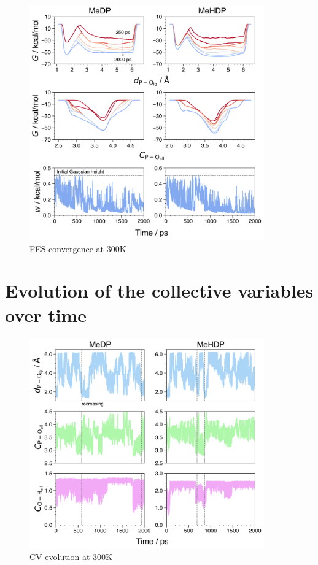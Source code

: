 \begin{figure}[ht]
    \centering
    \includegraphics[width=0.9\textwidth]{Figures/4_Results/results_300K_fes_convergence.png}
    \caption{FES convergence at 300K}
    \label{fig:300k_fes_convergence}
\end{figure}



\clearpage
\section{Evolution of the collective variables over time}

\begin{figure}[ht]
    \centering
    \includegraphics[width=0.9\textwidth]{Figures/4_Results/results_300K_cv_evolution.png}
    \caption{CV evolution at 300K}
    \label{fig:300k_cv_evolution}
\end{figure}



